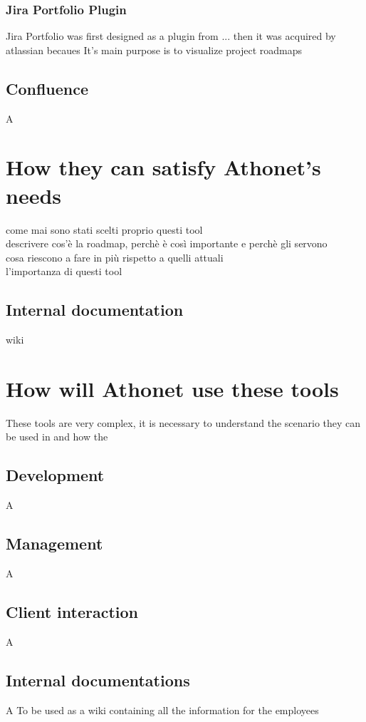 		\subsubsection{Jira Portfolio Plugin}
			Jira Portfolio was first designed as a plugin from ... then it was acquired by atlassian becaues
			It's main purpose is to visualize project roadmaps
		
	
	
	\subsection{Confluence}
		A

\section{How they can satisfy Athonet's needs}
come mai sono stati scelti proprio questi tool\\
descrivere cos'è la roadmap, perchè è così importante e perchè gli servono\\
cosa riescono a fare in più rispetto a quelli attuali\\
l'importanza di questi tool
		
	\subsection{Internal documentation}
		wiki

\section{How will Athonet use these tools}

	These tools are very complex, it is necessary to understand the scenario they can be used in and how the

	\subsection{Development} 
		A
	
	\subsection{Management} 
		A
	
	\subsection{Client interaction} 
		A
		
	\subsection{Internal documentations}
		A
		To be used as a wiki containing all the information for the employees
		
